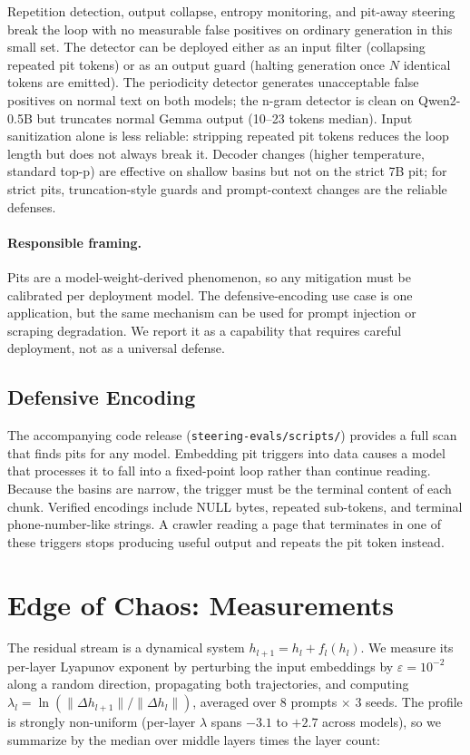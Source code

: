 \documentclass{article}
\begin{document}
Repetition detection, output collapse, entropy monitoring, and pit-away steering
break the loop with no measurable false positives on ordinary generation in this
small set. The detector can be deployed either as an input filter (collapsing
repeated pit tokens) or as an output guard (halting generation once $N$
identical tokens are emitted). The periodicity detector generates unacceptable
false positives on normal text on both models; the n-gram detector is clean on
Qwen2-0.5B but truncates normal Gemma output (10--23 tokens median). Input
sanitization alone is less reliable: stripping repeated pit tokens reduces the
loop length but does not always break it. Decoder changes (higher temperature,
standard top-p) are effective on shallow basins but not on the strict 7B pit;
for strict pits, truncation-style guards and prompt-context changes are the
reliable defenses.

\paragraph{Responsible framing.} Pits are a model-weight-derived phenomenon, so
any mitigation must be calibrated per deployment model. The defensive-encoding
use case is one application, but the same mechanism can be used for prompt
injection or scraping degradation. We report it as a capability that requires
careful deployment, not as a universal defense.

\subsection{Defensive Encoding}

The accompanying code release (\texttt{steering-evals/scripts/}) provides a
full scan that finds pits for any model. Embedding pit triggers into data causes
a model that processes it to fall into a fixed-point loop rather than continue
reading. Because the basins are narrow, the trigger must be the terminal
content of each chunk. Verified encodings include NULL bytes, repeated
sub-tokens, and terminal phone-number-like strings. A crawler reading a page
that terminates in one of these triggers stops producing useful output and
repeats the pit token instead.

\section{Edge of Chaos: Measurements}

The residual stream is a dynamical system $h_{l+1} = h_l + f_l(h_l)$. We
measure its per-layer Lyapunov exponent by perturbing the input embeddings by
$\varepsilon = 10^{-2}$ along a random direction, propagating both
trajectories, and computing $\lambda_l = \ln(\|\Delta h_{l+1}\| /
\|\Delta h_l\|)$, averaged over 8 prompts $\times$ 3 seeds. The profile is
strongly non-uniform (per-layer $\lambda$ spans $-3.1$ to $+2.7$ across
models), so we summarize by the median over middle layers times the layer
count:
\end{document}
